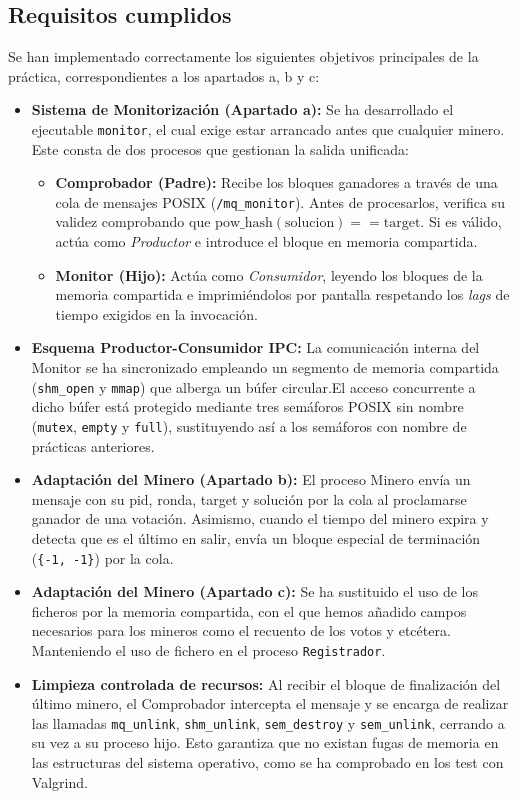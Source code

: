 \documentclass[12pt,a4paper]{article}
\begin{document}
\subsection{Requisitos cumplidos}
Se han implementado correctamente los siguientes objetivos principales de la práctica, correspondientes a los apartados a, b y c:
\begin{itemize}
    \item \textbf{Sistema de Monitorización (Apartado a):} Se ha desarrollado el ejecutable \texttt{monitor}, el cual exige estar arrancado antes que cualquier minero. Este consta de dos procesos que gestionan la salida unificada:
    \begin{itemize}
        \item \textbf{Comprobador (Padre):} Recibe los bloques ganadores a través de una cola de mensajes POSIX (\texttt{/mq\_monitor}). Antes de procesarlos, verifica su validez comprobando que $\mathrm{pow\_hash(solucion)} == \mathrm{target}$. Si es válido, actúa como \textit{Productor} e introduce el bloque en memoria compartida.
        \item \textbf{Monitor (Hijo):} Actúa como \textit{Consumidor}, leyendo los bloques de la memoria compartida e imprimiéndolos por pantalla respetando los \textit{lags} de tiempo exigidos en la invocación.
    \end{itemize}
    \item \textbf{Esquema Productor-Consumidor IPC:} La comunicación interna del Monitor se ha sincronizado empleando un segmento de memoria compartida (\texttt{shm\_open} y \texttt{mmap}) que alberga un búfer circular.El acceso concurrente a dicho búfer está protegido mediante tres semáforos POSIX sin nombre (\texttt{mutex}, \texttt{empty} y \texttt{full}), sustituyendo así a los semáforos con nombre de prácticas anteriores.
    \item \textbf{Adaptación del Minero (Apartado b):} El proceso Minero envía un mensaje con su pid, ronda, target y solución por la cola al proclamarse ganador de una votación. Asimismo, cuando el tiempo del minero expira y detecta que es el último en salir, envía un bloque especial de terminación (\texttt{\{-1, -1\}}) por la cola. 
    \item \textbf{Adaptación del Minero (Apartado c):} Se ha sustituido el uso de los ficheros por la memoria compartida, con el que hemos añadido campos necesarios para los mineros como el recuento de los votos y etcétera. Manteniendo el uso de fichero en el proceso \texttt{Registrador}.
    \item \textbf{Limpieza controlada de recursos:} Al recibir el bloque de finalización del último minero, el Comprobador intercepta el mensaje y se encarga de realizar las llamadas \texttt{mq\_unlink}, \texttt{shm\_unlink}, \texttt{sem\_destroy} y \texttt{sem\_unlink}, cerrando a su vez a su proceso hijo. Esto garantiza que no existan fugas de memoria en las estructuras del sistema operativo, como se ha comprobado en los test con Valgrind.
\end{itemize}
\end{document}
